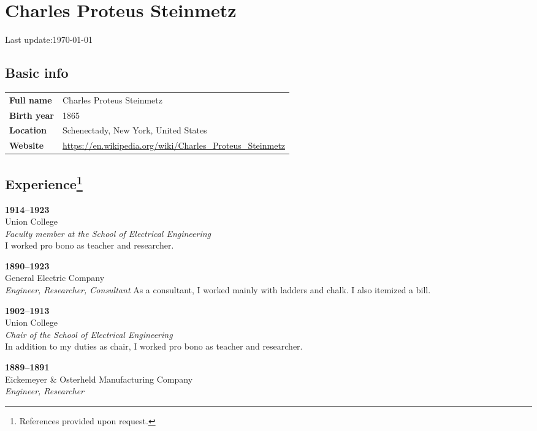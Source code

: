 \documentclass[a4paper]{article}
\newlength{\LASTUPDATESEP}\setlength{\LASTUPDATESEP}{1em}
\begin{document}
\section*{Charles Proteus Steinmetz}
\vspace{1em}
\vspace{\LASTUPDATESEP}
Last update:\@ \today{}%
\vspace{\LASTUPDATESEP}
\subsection*{Basic info}
%
\begin{tabularx}{\textwidth}{@{}lX}
     \textbf{Full name}  & Charles Proteus Steinmetz
  \\ \textbf{Birth year} & 1865
  \\ \textbf{Location}   & Schenectady, New York, United States
  \\ \textbf{Website}    & \url{https://en.wikipedia.org/wiki/Charles_Proteus_Steinmetz}
\end{tabularx}
\subsection*{Experience\footnote{References provided upon request.}}
\textbf{1914--1923}                                             \\
Union College                                                   \\
\textit{Faculty member at the School of Electrical Engineering} \\
I worked pro bono as teacher and researcher.
\par
\textbf{1890--1923}      \\
General Electric Company \\
\textit{Engineer, Researcher, Consultant}
As a consultant, I worked mainly with ladders and chalk. I also itemized a bill.
\par
\textbf{1902--1913}                                    \\
Union College                                          \\
\textit{Chair of the School of Electrical Engineering} \\
In addition to my duties as chair, I worked pro bono as teacher and researcher.
\par
\textbf{1889--1891}                           \\
Eickemeyer \& Osterheld Manufacturing Company \\
\textit{Engineer, Researcher}
\end{document}
